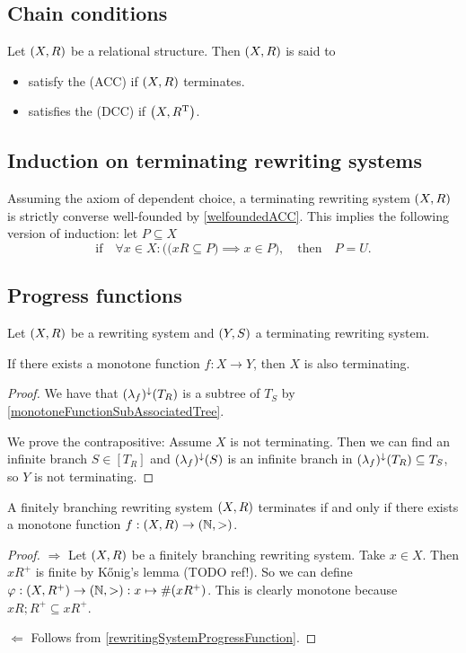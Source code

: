 \subsection{Chain conditions}
\begin{definition}
Let $\sSet{X, R}$ be a relational structure. Then $\sSet{X, R}$ is said to
\begin{itemize}
\item satisfy the  (ACC) if $\sSet{X, R}$ terminates.
\item satisfies the  (DCC) if $\sSet{X, R^\transp}$.
\end{itemize}
\end{definition}

\subsection{Induction on terminating rewriting systems}
Assuming the axiom of dependent choice, a terminating rewriting system $\sSet{X,R}$ is strictly converse well-founded by \ref{welfoundedACC}. This implies the following version of induction: let $P\subseteq X$
\[ \text{if}\quad  \forall x\in X: \Big(\big(xR\subseteq P\big)\implies x\in P\Big), \quad \text{then}\quad P=U. \]


\subsection{Progress functions}
\begin{proposition} \label{rewritingSystemProgressFunction}
Let $\sSet{X, R}$ be a rewriting system and $\sSet{Y,S}$ a terminating rewriting system.

If there exists a monotone function $f: X \to Y$, then $X$ is also terminating.
\end{proposition}
\begin{proof}
We have that $(\lambda_f)^\downarrow(T_R)$ is a subtree of $T_S$ by \ref{monotoneFunctionSubAssociatedTree}.

We prove the contrapositive: Assume $X$ is not terminating. Then we can find an infinite branch $S\in [T_R]$ and $(\lambda_f)^\downarrow(S)$ is an infinite branch in $(\lambda_f)^\downarrow(T_R) \subseteq T_S$, so $Y$ is not terminating.
\end{proof}

\begin{lemma}
A finitely branching rewriting system $\sSet{X,R}$ terminates \textup{if and only if} there exists a monotone function $f: \sSet{X,R} \to \sSet{\N,>}$.
\end{lemma}
\begin{proof}
$\boxed{\Rightarrow}$ Let $\sSet{X,R}$ be a finitely branching rewriting system. Take $x\in X$. Then $xR^+$ is finite by Kőnig's lemma (TODO ref!). So we can define $\varphi: \sSet{X, R^+}\to \sSet{\N, >}: x\mapsto \#(xR^+)$. This is clearly monotone because $xR;R^+ \subseteq xR^+$.

$\boxed{\Leftarrow}$ Follows from \ref{rewritingSystemProgressFunction}.
\end{proof}

